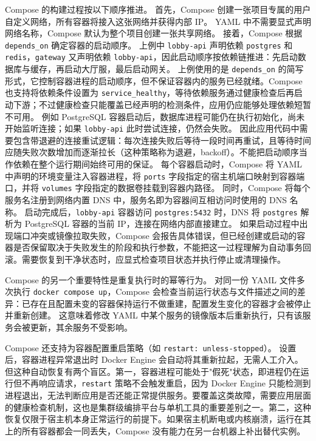 Compose 的构建过程按以下顺序推进。
首先，Compose 创建一张项目专属的用户自定义网络，所有容器将接入这张网络并获得内部 IP。
YAML 中不需要显式声明网络名称，Compose 默认为整个项目创建一张共享网络。
接着，Compose 根据 \texttt{depends\_on} 确定容器的启动顺序。
上例中 \texttt{lobby-api} 声明依赖 \texttt{postgres} 和 \texttt{redis}，\texttt{gateway} 又声明依赖 \texttt{lobby-api}，因此启动顺序按依赖链推进：先启动数据库与缓存，再启动大厅服，最后启动网关。
上例使用的是 \texttt{depends\_on} 的简写形式，它控制容器进程的启动顺序，但不保证容器内的服务已经就绪。Compose 也支持将依赖条件设置为 \texttt{service\_healthy}，等待依赖服务通过健康检查后再启动下游；不过健康检查只能覆盖已经声明的检测条件，应用仍应能够处理依赖短暂不可用。
例如 PostgreSQL 容器启动后，数据库进程可能仍在执行初始化，尚未开始监听连接；如果 \texttt{lobby-api} 此时尝试连接，仍然会失败。
因此应用代码中需要包含带退避的连接重试逻辑：每次连接失败后等待一段时间再重试，且等待时间应随失败次数增加而逐渐拉长（这种策略称为退避，backoff）。不能把启动顺序当作依赖在整个运行期间始终可用的保证。
每个容器启动时，Compose 将 YAML 中声明的环境变量注入容器进程，将 \texttt{ports} 字段指定的宿主机端口映射到容器端口，并将 \texttt{volumes} 字段指定的数据卷挂载到容器内路径。
同时，Compose 将每个服务名注册到网络内置 DNS 中，服务名即为容器间互相访问时使用的 DNS 名称。
启动完成后，\texttt{lobby-api} 容器访问 \texttt{postgres:5432} 时，DNS 将 \texttt{postgres} 解析为 PostgreSQL 容器的当前 IP，连接在网络内部直接建立。
如果启动过程中出现端口冲突或镜像拉取失败，Compose 会报告具体错误，但已经创建或启动的容器是否保留取决于失败发生的阶段和执行参数，不能把这一过程理解为自动事务回滚。需要恢复到干净状态时，应显式检查项目状态并执行停止或清理操作。

Compose 的另一个重要特性是重复执行时的幂等行为。
对同一份 YAML 文件多次执行 \texttt{docker compose up}，Compose 会检查当前运行状态与文件描述之间的差异：已存在且配置未变的容器保持运行不做重建，配置发生变化的容器才会被停止并重新创建。
这意味着修改 YAML 中某个服务的镜像版本后重新执行，只有该服务会被更新，其余服务不受影响。

Compose 还支持为容器配置重启策略（如 \texttt{restart: unless-stopped}）。
设置后，容器进程异常退出时 Docker Engine 会自动将其重新拉起，无需人工介入。
但这种自动恢复有两个盲区。第一，容器进程可能处于"假死"状态，即进程仍在运行但不再响应请求，\texttt{restart} 策略不会触发重启，因为 Docker Engine 只能检测到进程退出，无法判断应用是否还能正常提供服务。要覆盖这类故障，需要应用层面的健康检查机制，这也是集群级编排平台与单机工具的重要差别之一。第二，这种恢复仅限于宿主机本身正常运行的前提下。如果宿主机断电或内核崩溃，运行在其上的所有容器都会一同丢失，Compose 没有能力在另一台机器上补出替代实例。

